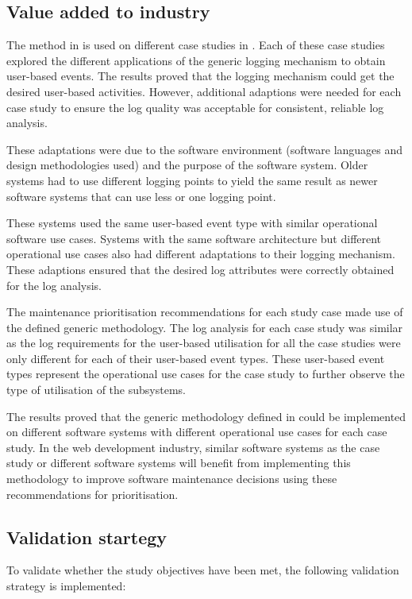 \subsection{Value added to industry}
The method in  is used on different case studies in .
Each of these case studies explored the different applications of the generic logging mechanism to
obtain user-based events. The results proved that the logging mechanism could get the desired
user-based activities. However, additional adaptions were needed for each case study to ensure the
log quality was acceptable for consistent, reliable log analysis.\par These adaptations were due to
the software environment (software languages and design methodologies used) and the purpose of the
software system. Older systems had to use different logging points to yield the same result as newer
software systems that can use less or one logging point.\par These systems used the same user-based
event type with similar operational software use cases. Systems with the same software architecture
but different operational use cases also had different adaptations to their logging mechanism. These
adaptions ensured that the desired log attributes were correctly obtained for the log analysis. \par
The maintenance prioritisation recommendations for each study case made use of the defined generic
methodology. The log analysis for each case study was similar as the log requirements for the
user-based utilisation for all the case studies were only different for each of their user-based
event types. These user-based event types represent the operational use cases for the case study to
further observe the type of utilisation of the subsystems. \par The results proved that the generic
methodology defined in  could be implemented on different software systems with
different operational use cases for each case study. In the web development industry, similar
software systems as the case study or different software systems will benefit from implementing this
methodology to improve software maintenance decisions using these recommendations for
prioritisation.

\subsection{Validation startegy}
To validate whether the study objectives have been met, the following validation strategy is
implemented:

